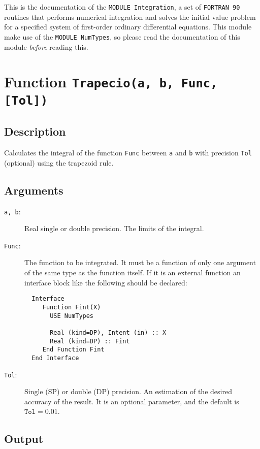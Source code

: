 This is the documentation of the \texttt{MODULE Integration}, a set
of \texttt{FORTRAN 90} routines that performs numerical integration
and solves the initial value problem for a specified system  of
first-order  ordinary  differential equations. This module make use
of the \texttt{MODULE NumTypes}, so please read the documentation of
this module \emph{before} reading this.


\section{Function \texttt{Trapecio(a, b, Func, [Tol])}}

\subsection{Description}

Calculates the integral of the function \texttt{Func} between
\texttt{a} and \texttt{b} with precision \texttt{Tol} (optional) using
the trapezoid rule.


\subsection{Arguments}

\begin{description}
\item[\texttt{a, b}:] Real single or double precision. The limits of
  the integral. 
\item[\texttt{Func}:] The function to be integrated. It must be a
  function of only one argument of the same type as the function
  itself. If it is an
  external function an interface block like the following should be
  declared: 
\begin{verbatim}
  Interface 
     Function Fint(X)
       USE NumTypes

       Real (kind=DP), Intent (in) :: X
       Real (kind=DP) :: Fint
     End Function Fint
  End Interface
\end{verbatim}
\item[\texttt{Tol}:] Single (SP) or double (DP) precision. An
  estimation of the desired accuracy of the result. It is an optional
  parameter, and the default is $\mathtt{Tol} = 0.01$. 
\end{description}


\subsection{Output}

